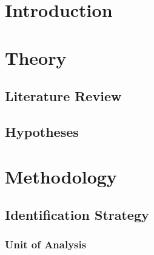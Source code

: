 \documentclass[a4paper,11pt]{article}
\begin{document}
\newpage
\listoftables
{}

\newpage
\pagestyle{plain}       
\setcounter{page}{1}    %

\hypertarget{introduction}{%
\section{Introduction}\label{introduction}}

\newpage

\hypertarget{theory}{%
\section{Theory}\label{theory}}

\hypertarget{literature-review}{%
\subsection{Literature Review}\label{literature-review}}

\hypertarget{hypotheses}{%
\subsection{Hypotheses}\label{hypotheses}}

\newpage

\hypertarget{methodology}{%
\section{Methodology}\label{methodology}}

\hypertarget{identification-strategy}{%
\subsection{Identification Strategy}\label{identification-strategy}}

\hypertarget{unit-of-analysis}{%
\subsubsection{Unit of Analysis}\label{unit-of-analysis}}
\end{document}
